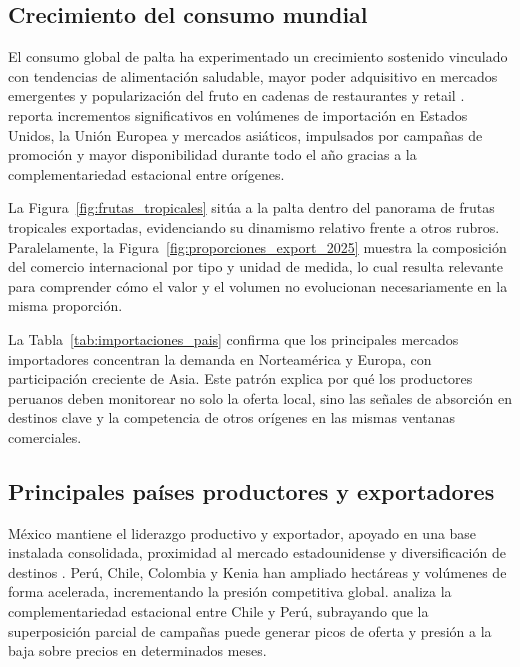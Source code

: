 \subsection{Crecimiento del consumo mundial}

El consumo global de palta ha experimentado un crecimiento sostenido vinculado con tendencias de alimentaci\'on saludable, mayor poder adquisitivo en mercados emergentes y popularizaci\'on del fruto en cadenas de restaurantes y retail \citep{ADEX2023, Zhang2025}. \citet{FAO2026} reporta incrementos significativos en vol\'umenes de importaci\'on en Estados Unidos, la Uni\'on Europea y mercados asi\'aticos, impulsados por campa\~nas de promoci\'on y mayor disponibilidad durante todo el a\~no gracias a la complementariedad estacional entre or\'igenes.

La Figura~\ref{fig:frutas_tropicales} sit\'ua a la palta dentro del panorama de frutas tropicales exportadas, evidenciando su dinamismo relativo frente a otros rubros. Paralelamente, la Figura~\ref{fig:proporciones_export_2025} muestra la composici\'on del comercio internacional por tipo y unidad de medida, lo cual resulta relevante para comprender c\'omo el valor y el volumen no evolucionan necesariamente en la misma proporci\'on.



La Tabla~\ref{tab:importaciones_pais} confirma que los principales mercados importadores concentran la demanda en Norteam\'erica y Europa, con participaci\'on creciente de Asia. Este patr\'on explica por qu\'e los productores peruanos deben monitorear no solo la oferta local, sino las se\~nales de absorci\'on en destinos clave y la competencia de otros or\'igenes en las mismas ventanas comerciales.



\subsection{Principales pa\'ises productores y exportadores}

M\'exico mantiene el liderazgo productivo y exportador, apoyado en una base instalada consolidada, proximidad al mercado estadounidense y diversificaci\'on de destinos \citep{SierraSelva2020}. Per\'u, Chile, Colombia y Kenia han ampliado hect\'areas y vol\'umenes de forma acelerada, incrementando la presi\'on competitiva global. \citet{Trincado2022} analiza la complementariedad estacional entre Chile y Per\'u, subrayando que la superposici\'on parcial de campa\~nas puede generar picos de oferta y presi\'on a la baja sobre precios en determinados meses.

